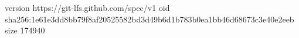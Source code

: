 version https://git-lfs.github.com/spec/v1
oid sha256:1e61e3dd8bb79f8af20525582bd3d49b6d1b783b0ea1bb46d68673c3e40e2eeb
size 174940
